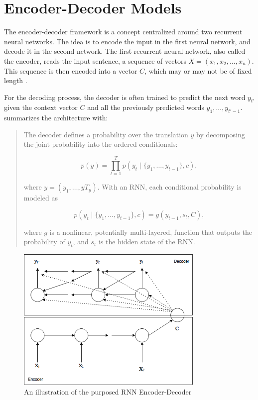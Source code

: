 
\section{Encoder-Decoder Models}
\label{sec:encoder-decoder}
The encoder-decoder framework is a concept centralized around two recurrent neural networks. The idea is to encode the input in the first neural network, and decode it in the second network. The first recurrent neural network, also called the encoder, reads the input sentence, a sequence of vectors \(X = (x_{1}, x_{2}, \ldots, x_{n})\). This sequence is then encoded into a vector \(C\), which may or may not be of fixed length \citep{sutskever2014sequence, cho2014learning}. 

For the decoding process, the decoder is often trained to predict the next word \(y_{t'}\) given the context vector \(C\) and all the previously predicted words \({y_1, \ldots, y_{t'-1}}\). \citep{bahdanau2014neural} summarizes the architecture with:

\begin{quote}
    The decoder defines a probability over the translation \(y\) by decomposing the joint probability into the ordered conditionals:
    
    \begin{equation}
        p(y)=\prod_{t=1}^{T} p(y_t \mid \{y_1, \ldots, y_{t-1}\}, c),
    \end{equation}
    
    where \(y = (y_1, \ldots, yT_y)\). With an RNN, each conditional probability is modeled as
    
    \begin{equation}
        p(y_t \mid \{y_1, \ldots, y_{t-1} \}, c) = g(y_{t-1}, s_t, C),
    \end{equation}
    
    where \(g\) is a nonlinear, potentially multi-layered, function that outputs the probability of \(y_t\), and \(s_t\) is the hidden state of the RNN.
    
\end{quote}

\begin{figure}[ht]
    \centering
    \includegraphics[width=0.8\textwidth]{fig/background_theory/encoder-decoder.png}
    \caption{An illustration of the purposed RNN Encoder-Decoder}
    \label{fig:purposed-encoder-decoder}
\end{figure}

